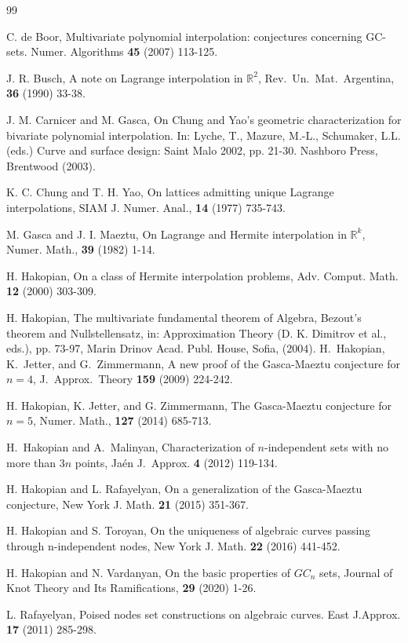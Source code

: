 \documentclass[a4paper,12pt]{article}
\theoremstyle{definition}
\numberwithin{equation}{section}
\numberwithin{figure}{section}
\begin{document}
\begin{thebibliography}{99}



{C. de Boor, Multivariate polynomial interpolation: conjectures concerning GC-sets. Numer. Algorithms
{\bf 45} (2007) 113-125.}

J. R. Busch,
{A note on Lagrange interpolation in $\mathbb{R}^2$},
Rev.\ Un.\ Mat.\ Argentina, {\bf 36} (1990) 33-38.

J. M. Carnicer and M. Gasca,
{On Chung and Yao's geometric characterization for bivariate polynomial
interpolation}. In: Lyche, T., Mazure, M.-L., Schumaker, L.L. (eds.) Curve and surface design: Saint
Malo 2002, pp. 21-30. Nashboro Press, Brentwood (2003).

K. C. Chung and T. H. Yao,
{On lattices admitting unique Lagrange interpolations},
SIAM J. Numer. Anal., {\bf 14} (1977) 735-743.

M. Gasca and J. I. Maeztu,
{On Lagrange and Hermite interpolation in $\mathbb{R}^k$},
Numer. Math., {\bf 39} (1982) 1-14.


{
        H. Hakopian, On a class of Hermite interpolation problems, Adv. Comput.
                Math. {\bf 12} (2000) 303-309.
}

{
    H. Hakopian, The multivariate fundamental theorem of Algebra, Bezout's theorem
        and Nullstellensatz, in: Approximation Theory (D. K. Dimitrov et al.,
        eds.), pp. 73-97, Marin Drinov Acad. Publ. House, Sofia, (2004).}
H.~Hakopian, K.~Jetter, and G.~Zimmermann,
{A new proof of the Gasca-Maeztu conjecture for $n=4$},
J.\ Approx.\ Theory {\bf 159} (2009) 224-242.


H. Hakopian, K. Jetter, and G. Zimmermann, The Gasca-Maeztu
conjecture for $n=5$,  Numer. Math.,  {\bf 127} (2014) 685-713.


{H.~Hakopian and A.~Malinyan,
{Characterization of $n$-independent sets with no more than $3n$ points},
Ja\'en J.\ Approx. {\bf 4} (2012) 119-134.}

{H. Hakopian and L. Rafayelyan,
On a generalization of the Gasca-Maeztu
conjecture,
New York J. Math. {\bf 21}
 (2015) 351-367.}

{H. Hakopian and S. Toroyan,
On the uniqueness of algebraic curves
passing through n-independent nodes,
New York J. Math. {\bf 22}
 (2016) 441-452.}

{H. Hakopian and N. Vardanyan,
On the basic properties of $GC_n$ sets,
Journal of Knot Theory and Its Ramifications,
{\bf 29} (2020) 1-26.}

{L. Rafayelyan, Poised nodes set constructions on algebraic curves. East J.Approx. {\bf 17} (2011) 285-298. }


\end{thebibliography}
\end{document}
